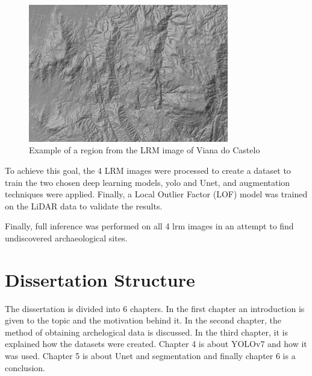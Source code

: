 \begin{figure}[H]
\centering
\includegraphics[height=6cm]{images/exampleLRM.png}
\caption{Example of a region from the LRM image of Viana do Castelo}

\end{figure}


To achieve this goal, the 4 LRM images were processed to create a dataset to train the two chosen deep learning models, \ac{yolo} and Unet, and augmentation techniques were applied. Finally, a Local Outlier Factor (LOF) model was trained on the LiDAR data to validate the results.

Finally, full inference was performed on all 4 \ac{lrm} images in an attempt to find undiscovered archaeological sites.

\section{Dissertation Structure}
The dissertation is divided into 6 chapters. In the first chapter an introduction is given to the topic and the motivation behind it. In the second chapter, the method of obtaining archelogical data is discussed. In the third chapter, it is explained how the datasets were created. Chapter 4 is about YOLOv7 and how it was used. Chapter 5 is about Unet and segmentation and finally chapter 6 is a conclusion.
